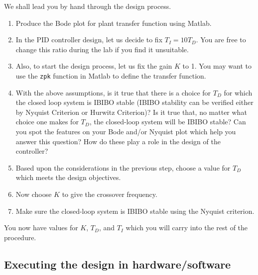 We shall lead you by hand through the design process.
\begin{enumerate}
    \item Produce the Bode plot for plant transfer function using
          \textsf{Matlab}.

    \item In the PID controller design, let us decide to fix \(T_{I}=10T_{D}\).
          You are free to change this ratio during the lab if you find it unsuitable.

    \item Also, to start the design process, let us fix the gain \(K\) to 1.  You
          may want to use the \verb|zpk| function in \textsf{Matlab} to define the
          transfer function.

    \item With the above assumptions, is it true that there is a choice for
          \(T_{D}\) for which the closed loop system is IBIBO stable (IBIBO stability can
          be verified either by Nyquist Criterion or Hurwitz Criterion)?  Is it true
          that, no matter what choice one makes for \(T_{D}\), the closed-loop system
          will be IBIBO stable?  Can you spot the features on your Bode and/or Nyquist
          plot which help you answer this question?  How do these play a role in the
          design of the controller?

    \item Based upon the considerations in the previous step, choose a value for
          \(T_{D}\) which meets the design objectives.

    \item Now choose \(K\) to give the crossover frequency.

    \item Make sure the closed-loop system is IBIBO stable using the Nyquist
          criterion.
\end{enumerate}

You now have values for \(K\), \(T_{D}\), and \(T_{I}\) which you will carry
into the rest of the procedure.

\subsection{Executing the design in hardware/software}

